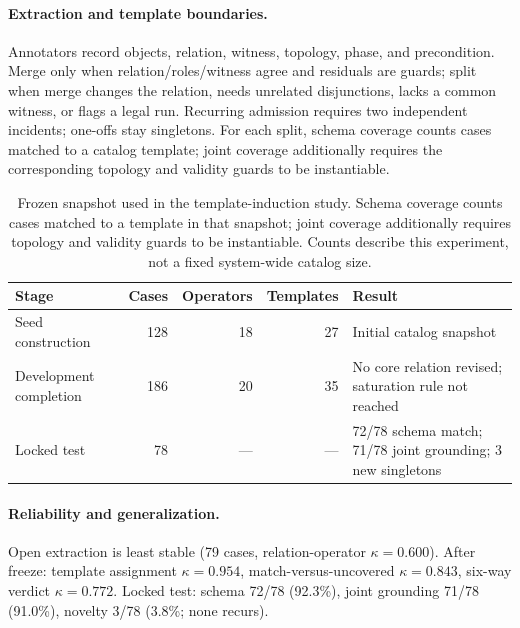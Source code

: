 \documentclass[sigconf,nonacm]{acmart}
\begin{document}
\paragraph{Extraction and template boundaries.}
Annotators record objects, relation, witness, topology, phase, and
precondition. Merge only when relation/roles/witness agree and residuals are
guards; split when merge changes the relation, needs unrelated disjunctions,
lacks a common witness, or flags a legal run. Recurring admission requires two
independent incidents; one-offs stay singletons.
For each split, schema coverage counts cases matched to a catalog template;
joint coverage additionally requires the corresponding topology and validity
guards to be instantiable.

\begin{table}[H]
\centering
\small
\caption{Frozen snapshot used in the template-induction study. Schema coverage counts cases matched to a template in that snapshot; joint coverage additionally requires topology and validity guards to be instantiable. Counts describe this experiment, not a fixed system-wide catalog size.}
\label{tab:template-induction}
\begin{tabularx}{\linewidth}{l r r r X}
\toprule
\textbf{Stage} & \textbf{Cases} & \textbf{Operators} & \textbf{Templates} & \textbf{Result} \\
\midrule
Seed construction & 128 & 18 & 27 & Initial catalog snapshot \\
Development completion & 186 & 20 & 35 & No core relation revised; saturation rule not reached \\
Locked test & 78 & --- & --- & 72/78 schema match; 71/78 joint grounding; 3 new singletons \\
\bottomrule
\end{tabularx}
\end{table}

\paragraph{Reliability and generalization.}
Open extraction is least stable (79 cases, relation-operator $\kappa{=}0.600$).
After freeze: template assignment $\kappa{=}0.954$, match-versus-uncovered
$\kappa{=}0.843$, six-way verdict $\kappa{=}0.772$. Locked test: schema 72/78
(92.3\%), joint grounding 71/78 (91.0\%), novelty 3/78 (3.8\%; none recurs).
\end{document}
